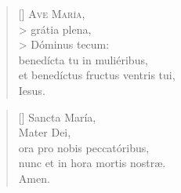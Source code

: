\documentclass{article}
\begin{document}
\begin{mdframed}

\settowidth{\versewidth}{Et ne nos ind\'ucas in tentati\'onem}

\begin{verse}[\versewidth]
\lettrine[lhang=1.0,nindent=0em]{A}{ve Mar\'ia}, \\>
gr\'atia plena,\\>
D\'ominus tecum: \\
bened\'icta tu in muli\'eribus, \\
et bened\'ictus fructus ventris tui, \\
Iesus.
\end{verse}

\begin{verse}[\versewidth]
Sancta Mar\'ia, \\
Mater Dei, \\
ora pro nobis peccat\'oribus, \\
nunc et in hora mortis nostr\ae. \\
Amen. \\[4\baselineskip]
\end{verse}

\end{mdframed}
\end{document}
